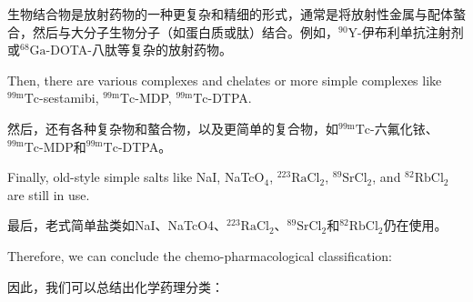 \documentclass[dvipsnames, svgnames,a4paper,11pt]{article}
\begin{document}
生物结合物是放射药物的一种更复杂和精细的形式，通常是将放射性金属与配体螯合，然后与大分子生物分子（如蛋白质或肽）结合。例如，${}^\text{90}\text{Y}$-伊布利单抗注射剂或${}^\text{68}\text{Ga}$-DOTA-八肽等复杂的放射药物。


Then, there are various complexes and chelates or more simple complexes like \(\mathrm{^{99m}Tc}\)-sestamibi, \(\mathrm{^{99m}Tc}\)-MDP, \(\mathrm{^{99m}Tc}\)-DTPA.  

然后，还有各种复杂物和螯合物，以及更简单的复合物，如${}^\text{99m}\text{Tc}$-六氟化铱、${}^\text{99m}\text{Tc}$-MDP和${}^\text{99m}\text{Tc}$-DTPA。

Finally, old-style simple salts like NaI, NaTcO\(_4\), \(\mathrm{^{223}Ra}\)Cl\(_2\), \(\mathrm{^{89}Sr}\)Cl\(_2\), and \(\mathrm{^{82}Rb}\)Cl\(_2\) are still in use.  

最后，老式简单盐类如NaI、NaTcO4、${}^\text{223}\text{RaCl}_2$、${}^\text{89}\text{SrCl}_2$和${}^\text{82}\text{RbCl}_2$仍在使用。

Therefore, we can conclude the chemo-pharmacological classification:

因此，我们可以总结出化学药理分类：
\end{document}

